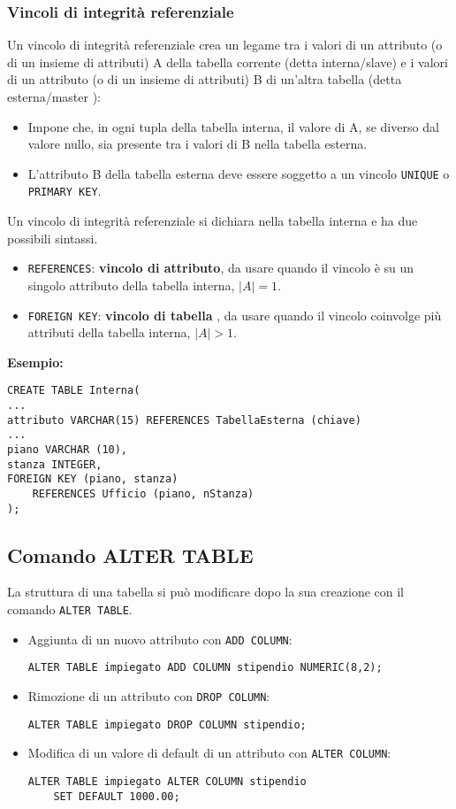 \documentclass[a4paper, 10pt, titlepage]{article}
\begin{document}
	\subsubsection{Vincoli di integrità referenziale}
	Un vincolo di integrità referenziale crea un legame tra i valori di un attributo (o di un insieme di attributi) A della tabella corrente (detta 
	interna/slave) e i valori di un attributo (o di un insieme di attributi) B di
un’altra tabella (detta esterna/master ):
\begin{itemize}
\item Impone che, in ogni tupla della tabella interna, il valore di A, se diverso
dal valore nullo, sia presente tra i valori di B nella tabella esterna.
\item L’attributo B della tabella esterna deve essere soggetto a un vincolo \lstinline|UNIQUE| o \lstinline|PRIMARY KEY|.
\end{itemize}
		Un vincolo di integrità referenziale si dichiara nella tabella interna e ha
		due possibili sintassi.
		\begin{itemize}
			\item \lstinline|REFERENCES|: \textbf{vincolo di attributo}, da usare quando il vincolo è su un
			singolo attributo della tabella interna, $ |A| = 1 $.
			\item \lstinline|FOREIGN KEY|: \textbf{vincolo di tabella} , da usare quando il vincolo coinvolge più attributi della tabella interna, $ |A| > 1 $.
		\end{itemize}
		\textbf{Esempio:}
		\begin{lstlisting}
CREATE TABLE Interna(
...
attributo VARCHAR(15) REFERENCES TabellaEsterna (chiave)
...
piano VARCHAR (10),
stanza INTEGER,
FOREIGN KEY (piano, stanza) 
	REFERENCES Ufficio (piano, nStanza)
);
		\end{lstlisting}
		
	\subsection{Comando ALTER TABLE}
		La struttura di una tabella si può modificare dopo la sua creazione con il
		comando \lstinline|ALTER TABLE|.
		\begin{itemize}
			\item Aggiunta di un nuovo attributo con \lstinline|ADD COLUMN|:
			\begin{lstlisting}
ALTER TABLE impiegato ADD COLUMN stipendio NUMERIC(8,2);
			\end{lstlisting}
			\item Rimozione di un attributo con \lstinline|DROP COLUMN|:
			\begin{lstlisting}
ALTER TABLE impiegato DROP COLUMN stipendio;
			\end{lstlisting}
			\item Modifica di un valore di default di un attributo con \lstinline|ALTER COLUMN|:
			\begin{lstlisting}
ALTER TABLE impiegato ALTER COLUMN stipendio
	SET DEFAULT 1000.00;
			\end{lstlisting}			
		\end{itemize}
		
\end{document}

